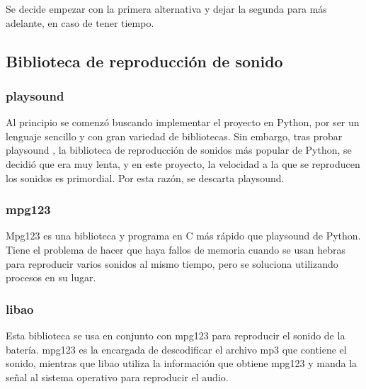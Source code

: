         Se decide empezar con la primera alternativa y dejar la segunda para más adelante, en caso de tener tiempo.

        \subsection{Biblioteca de reproducción de sonido} %
        \label{sub:LibreriaDeReproduccionDeSonido}

            \subsubsection{playsound} %
            \label{ssub:Playsound}

                Al principio se comenzó buscando implementar el proyecto en Python, por ser un lenguaje sencillo y con
                gran variedad de bibliotecas. Sin embargo, tras probar playsound \cite{playsound}, la biblioteca de
                reproducción de sonidos más popular de Python, se decidió que era muy lenta, y en este proyecto, la
                velocidad a la que se reproducen los sonidos es primordial. Por esta razón, se descarta playsound.


            \subsubsection{mpg123} %
            \label{ssub:Mpg123}

                Mpg123 \cite{mpg123} es una biblioteca y programa en C más rápido que playsound de Python. Tiene el
                problema de hacer que haya fallos de memoria cuando se usan hebras para reproducir varios sonidos al
                mismo tiempo, pero se soluciona utilizando procesos en su lugar.


            \subsubsection{libao} %
            \label{ssub:Libao}

                Esta biblioteca se usa en conjunto con mpg123 para reproducir el sonido de la batería.
                mpg123 es la encargada de descodificar el archivo mp3 que contiene el sonido, mientras que
                libao \cite{libao} utiliza la información que obtiene mpg123 y manda la señal al sistema operativo para
                reproducir el audio.

